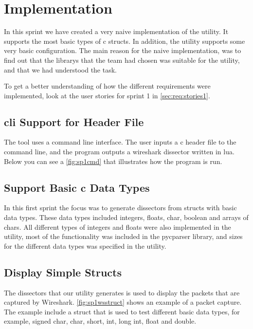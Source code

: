 \section{Implementation}
\label{sec:sp1:impl}
In this sprint we have created a very naive implementation of the \gls{utility}. It
supports the most basic types of \Gls{c} \glspl{struct}. In addition, the \gls{utility} supports
some very basic configuration. The main reason for the naive implementation, 
was to find out that the \glspl{library} that the team had chosen was suitable for 
the \gls{utility}, and that we had understood the task.

To get a better understanding of how the different requirements were implemented,
look at the user stories for sprint 1 in \autoref{sec:req:stories1}.

\subsection{\gls{cli} Support for Header File}
The tool uses a command line interface. The user inputs a \Gls{c} \gls{header} file to the 
command line, and the program outputs a \Gls{wireshark} \gls{dissector} written in \Gls{lua}. 
Below you can see a \autoref{fig:sp1cmd} that illustrates how the program is 
run. 

\subsection{Support Basic \Gls{c} Data Types}
In this first sprint the focus was to generate \glspl{dissector} from \glspl{struct} with 
basic data types. These data types included \glspl{integer}, \glspl{float}, \gls{char}, \gls{boolean} and 
\glspl{array} of \glspl{char}. All different types of \glspl{integer} and \glspl{float} were also 
implemented in the \gls{utility}, most of the functionality was included in the 
\gls{pycparser} \gls{library}, and sizes for the different data types was specified in the 
\gls{utility}.

\subsection{Display Simple Structs}
The \glspl{dissector} that our \gls{utility} generates is used to display the \glspl{packet} that 
are captured by Wireshark. \autoref{fig:sp1wsstruct} shows an example of a 
\gls{packet} capture. The example include a \gls{struct} that is used to test different 
basic data types, for example, signed \gls{char}, \gls{char}, short, \gls{int}, long \gls{int}, \gls{float} 
and \gls{double}.


